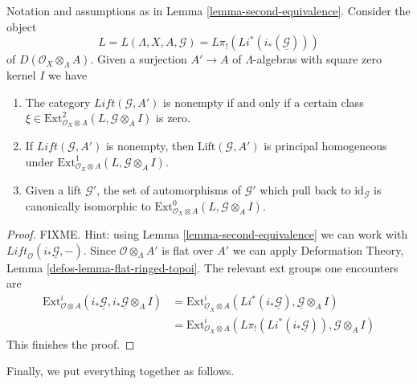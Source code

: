 \begin{lemma}
\label{lemma-second-equivalence-obs}
Notation and assumptions as in Lemma \ref{lemma-second-equivalence}.
Consider the object
$$
L = L(\Lambda, X, A, \mathcal{G}) = L\pi_!(Li^*(i_*(\underline{\mathcal{G}})))
$$
of $D(\mathcal{O}_X \otimes_\Lambda A)$. Given a surjection $A' \to A$ of
$\Lambda$-algebras with square zero kernel $I$ we have
\begin{enumerate}
\item The category $\textit{Lift}(\mathcal{G}, A')$ is nonempty
if and only if a certain class
$\xi \in \text{Ext}^2_{\mathcal{O}_X \otimes A}(L, \mathcal{G} \otimes_A I)$
is zero.
\item If $\textit{Lift}(\mathcal{G}, A')$ is nonempty, then
$\text{Lift}(\mathcal{G}, A')$ is principal homogeneous under
$\text{Ext}^1_{\mathcal{O}_X \otimes A}(L, \mathcal{G} \otimes_A I)$.
\item Given a lift $\mathcal{G}'$, the set of automorphisms of
$\mathcal{G}'$ which pull back to $\text{id}_\mathcal{G}$ is canonically
isomorphic to
$\text{Ext}^0_{\mathcal{O}_X \otimes A}(L, \mathcal{G} \otimes_A I)$.
\end{enumerate}
\end{lemma}

\begin{proof}
FIXME. Hint: using Lemma \ref{lemma-second-equivalence}
we can work with $\textit{Lift}_\mathcal{O}(i_*\underline{\mathcal{G}}, -)$.
Since $\mathcal{O} \otimes_\Lambda A'$ is flat over $A'$ we can apply
Deformation Theory, Lemma \ref{defos-lemma-flat-ringed-topoi}.
The relevant ext groups one encounters are
\begin{align*}
\text{Ext}^i_{\mathcal{O} \otimes A}(i_*\underline{\mathcal{G}},
i_*\underline{\mathcal{G}} \otimes_A I)
& =
\text{Ext}^i_{\underline{\mathcal{O}}_X \otimes A}(
Li^*(i_*\underline{\mathcal{G}}), \underline{\mathcal{G}} \otimes_A I) \\
& =
\text{Ext}^i_{\mathcal{O}_X \otimes A}(
L\pi_!(Li^*(i_*\underline{\mathcal{G}})), \mathcal{G} \otimes_A I)
\end{align*}
This finishes the proof.
\end{proof}

\noindent
Finally, we put everything together as follows.

